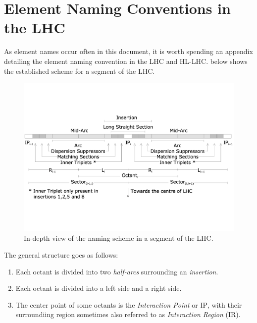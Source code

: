\chapter{Element Naming Conventions in the LHC} %

\label{Appendix_Naming_Conventions} %


As element names occur often in this document, it is worth spending an appendix detailing the element naming convention in the LHC and HL-LHC.
 below shows the established scheme for a segment of the LHC.

\begin{figure}[h]
    \centering
    \includegraphics*[width=0.99\linewidth]{Figures/Appendices/LHC_naming_scheme.pdf}
    \caption{In-depth view of the naming scheme in a segment of the LHC.}
    \label{fig:lhc_segment_naming_scheme}
  \end{figure}

The general structure goes as follows:
\begin{enumerate}
    \item Each octant is divided into two \textit{half-arcs} surrounding an \textit{insertion}.
    \item Each octant is divided into a left side and a right side.
    \item The center point of some octants is the \textit{Interaction Point} or $\mathrm{IP}$, with their surroundiing region sometimes also referred to as \textit{Interaction Region} ($\mathrm{IR}$).
\end{enumerate}

